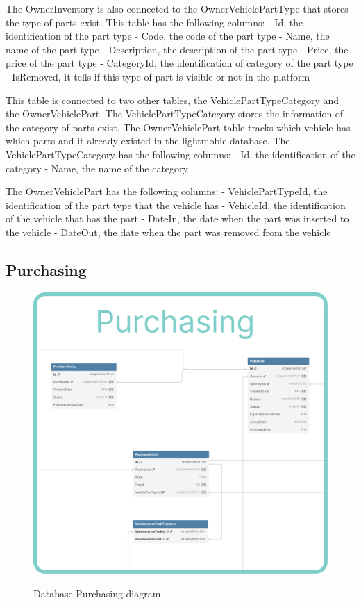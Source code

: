 The OwnerInventory is also connected to the OwnerVehiclePartType that stores the type of parts exist.
This table has the following columns:
- Id, the identification of the part type
- Code, the code of the part type
- Name, the name of the part type
- Description, the description of the part type
- Price, the price of the part type
- CategoryId, the identification of category of the part type
- IsRemoved, it tells if this type of part is visible or not in the platform

This table is connected to two other tables, the VehiclePartTypeCategory and the OwnerVehiclePart.
The VehiclePartTypeCategory stores the information of the category of parts exist. 
The OwnerVehiclePart table tracks which vehicle has which parts and it already existed in the lightmobie database.
The VehiclePartTypeCategory has the following columns:
- Id, the identification of the category
- Name, the name of the category

The OwnerVehiclePart has the following columns:
- VehiclePartTypeId, the identification of the part type that the vehicle has
- VehicleId, the identification of the vehicle that has the part
- DateIn, the date when the part was inserted to the vehicle
- DateOut, the date when the part was removed from the vehicle



\subsection{Purchasing} 


\begin{figure}[h]
  \caption{Database Purchasing diagram.}
  \centering
  \includegraphics[width=\textwidth]{figs/dbDiagrams/Purchasing}
  \label{fig:figure2}
\end{figure}

